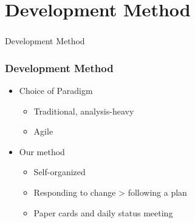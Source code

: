 \section[Dev. Method]{Development Method}

\begin{frame}
  \frametitle{}
  \begin{center}
    {\Huge Development Method}
  \end{center}
\end{frame}

\begin{frame}
    \frametitle{Development Method}
    \begin{itemize}
			\item Choice of Paradigm
		  \begin{itemize}
				\item Traditional, analysis-heavy
				\item Agile
			\end{itemize}
			\item Our method
			\begin{itemize}
				\item Self-organized
				\item Responding to change > following a plan
				\item Paper cards and daily status meeting
			\end{itemize}
		\end{itemize}
\end{frame}
